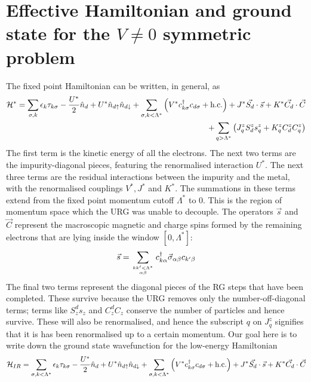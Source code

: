 \documentclass[12pt,twoside]{report}
\numberwithin{equation}{section}
\begin{document}
\section{Effective Hamiltonian and ground state for the \(V\neq 0\) symmetric problem}
The fixed point Hamiltonian can be written, in general, as
\begin{equation}\begin{aligned}
	\mathcal{H}^* = \sum_{\sigma, k}\epsilon_k \tau_{k\sigma} - \frac{U^*}{2}\hat n_d + U^* \hat n_{d\uparrow}\hat n_{d\downarrow} + \sum_{\sigma, k < \Lambda^*}\left( V^* c^\dagger_{k\sigma}c_{d\sigma} + \text{h.c.} \right) + J^* \vec{S_d}\cdot\vec{s} + K^* \vec{C_d}\cdot\vec{C} \\
	+ \sum_{q > \Lambda^*}\left(J^z_q S^z_ds^z_q + K^z_q C^z_dC^z_q\right) 
\end{aligned}\end{equation}
The first term is the kinetic energy of all the electrons. The next two terms are the impurity-diagonal pieces, featuring the renormalised interaction \(U^*\). The next three terms are the residual interactions between the impurity and the metal, with the renormalised couplings \(V^*, J^*\) and \(K^*\). The summations in these terms extend from the fixed point momentum cutoff \(\Lambda^*\) to 0. This is the region of momentum space  which the URG was unable to decouple. The operators \(\vec s\) and \(\vec C\) represent the macroscopic magnetic and charge spins formed by the remaining electrons that are lying inside the window \(\left[ 0, \Lambda^* \right] \):
\begin{equation}\begin{aligned}
	\vec s = \sum_{kk^\prime<\Lambda^*\atop{\alpha\beta}} c^\dagger_{k\alpha}\vec \sigma_{\alpha\beta}c_{k^\prime\beta}
\end{aligned}\end{equation}
The final two terms represent the diagonal pieces of the RG steps that have been completed. These survive because the URG removes only the number-off-diagonal terms; terms like \(S^d_z s_z\) and \(C^d_z C_z\) conserve the number of particles and hence survive. These will also be renormalised, and hence the subscript \(q\) on \(J^z_q\) signifies that it is has been renormalised up to a certain momentum.
\pb Our goal here is to write down the ground state wavefunction for the low-energy Hamiltonian
\begin{equation}\begin{aligned}
	\label{fixed_point_ham}
	\mathcal{H}_{IR} = \sum_{\sigma, k<\Lambda^*}\epsilon_k \tau_{k\sigma} - \frac{U^*}{2}\hat n_d + U^* \hat n_{d\uparrow}\hat n_{d\downarrow} + \sum_{\sigma, k < \Lambda^*}\left( V^* c^\dagger_{k\sigma}c_{d\sigma} + \text{h.c.} \right) + J^* \vec{S_d}\cdot\vec{s} + K^* \vec{C_d}\cdot\vec{C}
\end{aligned}\end{equation}
\end{document}
